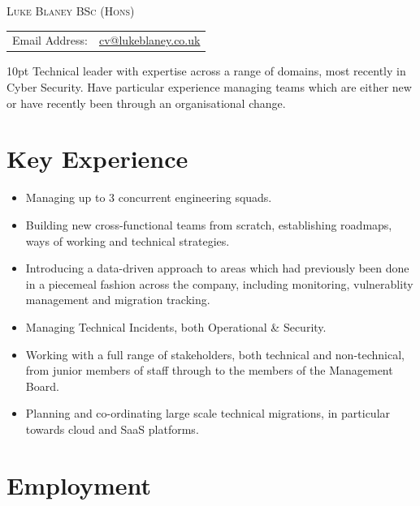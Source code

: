 \documentclass[a4paper]{article}
\newenvironment{detail}{\begin{adjustwidth}{10pt}{}}{\end{adjustwidth}}
\begin{document}
\begin{center}\textsc{\LARGE Luke Blaney BSc (Hons)}\end{center}

\begin{tabular}{ l l }

Email Address: & \href{mailto:cv@lukeblaney.co.uk}{cv@lukeblaney.co.uk}\\

\end{tabular}

\begin{detail}
Technical leader with expertise across a range of domains, most recently in Cyber Security.  Have particular experience managing teams which are either new or have recently been through an organisational change.
\end{detail}

\section*{Key Experience}

\begin{itemize}
	\item Managing up to 3 concurrent engineering squads.
	\item Building new cross-functional teams from scratch, establishing roadmaps, ways of working and technical strategies.
	\item Introducing a data-driven approach to areas which had previously been done in a piecemeal fashion across the company, including monitoring, vulnerablity management and migration tracking.
	\item Managing Technical Incidents, both Operational \& Security.
	\item Working with a full range of stakeholders, both technical and non-technical, from junior members of staff through to the members of the Management Board.
	\item Planning and co-ordinating large scale technical migrations, in particular towards cloud and SaaS platforms.
\end{itemize}

\section*{Employment}
\end{document}
